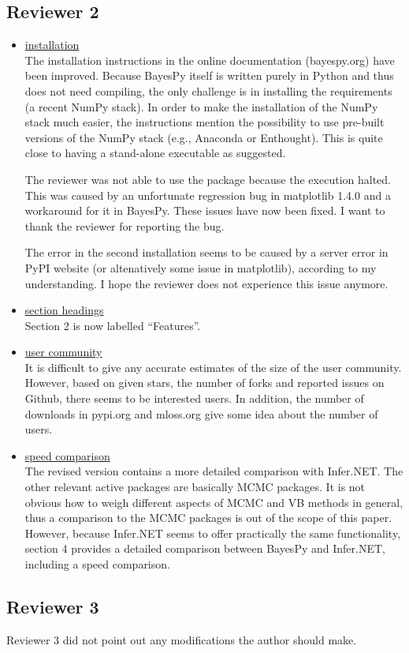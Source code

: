 \documentclass{article}
\begin{document}
\subsection{Reviewer 2}

\begin{itemize}

\item \underline{installation}
  \\
  The installation instructions in the online documentation (bayespy.org) have
  been improved.  Because BayesPy itself is written purely in Python and thus
  does not need compiling, the only challenge is in installing the requirements
  (a recent NumPy stack).  In order to make the installation of the NumPy stack
  much easier, the instructions mention the possibility to use pre-built
  versions of the NumPy stack (e.g., Anaconda or Enthought).  This is quite
  close to having a stand-alone executable as suggested.

  The reviewer was not able to use the package because the execution halted.
  This was caused by an unfortunate regression bug in matplotlib 1.4.0 and a
  workaround for it in BayesPy.  These issues have now been fixed.  I want to
  thank the reviewer for reporting the bug.

  The error in the second installation seems to be caused by a server error in
  PyPI website (or altenatively some issue in matplotlib), according to my
  understanding.  I hope the reviewer does not experience this issue anymore.

\item \underline{section headings}
  \\
  Section 2 is now labelled ``Features''.

\item \underline{user community}
  \\
  It is difficult to give any accurate estimates of the size of the user
  community.  However, based on given stars, the number of forks and reported
  issues on Github, there seems to be interested users.  In addition, the number
  of downloads in pypi.org and mloss.org give some idea about the number of
  users.

\item \underline{speed comparison}
  \\
  The revised version contains a more detailed comparison with Infer.NET.  The
  other relevant active packages are basically MCMC packages.  It is not obvious
  how to weigh different aspects of MCMC and VB methods in general, thus a
  comparison to the MCMC packages is out of the scope of this paper.  However,
  because Infer.NET seems to offer practically the same functionality, section 4
  provides a detailed comparison between BayesPy and Infer.NET, including a
  speed comparison.

\end{itemize}

\subsection{Reviewer 3}

Reviewer 3 did not point out any modifications the author should make.
\end{document}
